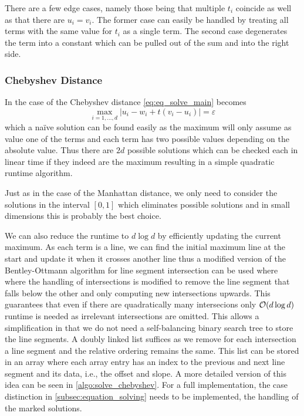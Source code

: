 There are a few edge cases, namely those being that multiple \(t_i\) coincide as well as that there are \(u_i = v_i\). The former case can easily be handled by treating all terms with the same value for \(t_i\) as a single term. The second case degenerates the term into a constant which can be pulled out of the sum and into the right side.



\subsubsection{Chebyshev Distance}
\label{subsubsec:eq_chebyshev_distance}
In the case of the Chebyshev distance \cref{eq:eq_solve_main} becomes 
\begin{equation}
  \max_{i = 1,\dots, d} |u_i - w_i + t(v_i - u_i)| = \varepsilon\label{eq:solve_chebyshev}
\end{equation}
which a na\"ive solution can be found easily as the maximum will only assume as value one of the terms and each term has two possible values depending on the absolute value. Thus there are \(2d\) possible solutions which can be checked each in linear time if they indeed are the maximum resulting in a simple quadratic runtime algorithm. 

Just as in the case of the Manhattan distance, we only need to consider the solutions in the interval \([0,1]\) which eliminates possible solutions and in small dimensions this is probably the best choice. 

We can also reduce the runtime to \(d \log d\) by efficiently updating the current maximum. As each term is a line, we can find the initial maximum line at the start and update it when it crosses another line thus a modified version of the Bentley-Ottmann algorithm for line segment intersection can be used where where the handling of intersections is modified to remove the line segment that falls below the other and only computing new intersections upwards. This guarantees that even if there are quadratically many intersecions only \(\mathcal{O}(d \log d)\) runtime is needed as irrelevant intersections are omitted. 
This allows a simplification in that we do not need a self-balancing binary search tree to store the line segments. A doubly linked list suffices as we remove for each intersection a line segment and the relative ordering remains the same. This list can be stored in an array where each array entry has an index to the previous and next line segment and its data, i.e., the offset and slope. A more detailed version of this idea can be seen in \cref{algo:solve_chebyshev}. For a full implementation, the case distinction in \cref{subsec:equation_solving} needs to be implemented, the handling of the marked solutions.

